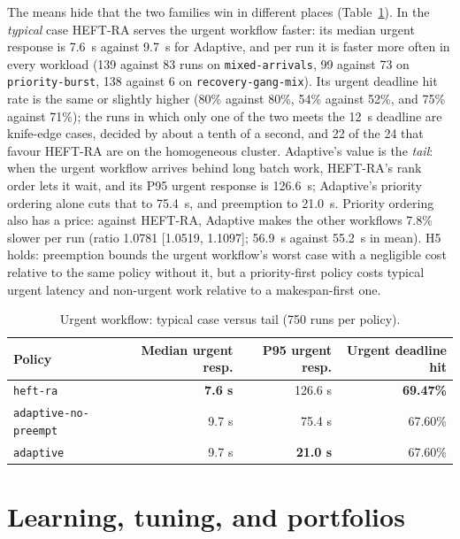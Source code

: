 \documentclass[12pt,a4paper]{report}
\newcommand{\pol}[1]{\texttt{#1}}
\begin{document}
The means hide that the two families win in different places
(Table~\ref{tab:urgent-tail}). In the \emph{typical} case HEFT-RA serves
the urgent workflow faster: its median urgent response is 7.6~s against
9.7~s for Adaptive, and per run it is faster more often in every workload
(139 against 83 runs on \texttt{mixed-arrivals}, 99 against 73 on
\texttt{priority-burst}, 138 against 6 on \texttt{recovery-gang-mix}). Its
urgent deadline hit rate is the same or slightly higher (80\% against 80\%,
54\% against 52\%, and 75\% against 71\%); the runs in which only one of
the two meets the 12~s deadline are knife-edge cases, decided by about a
tenth of a second, and 22 of the 24 that favour HEFT-RA are on the
homogeneous cluster. Adaptive's value is the \emph{tail}: when the urgent
workflow arrives behind long batch work, HEFT-RA's rank order lets it wait,
and its P95 urgent response is 126.6~s; Adaptive's priority ordering alone
cuts that to 75.4~s, and preemption to 21.0~s. Priority ordering also has a
price: against HEFT-RA, Adaptive makes the other workflows 7.8\% slower per
run (ratio 1.0781 [1.0519, 1.1097]; 56.9~s against 55.2~s in mean). H5
holds: preemption bounds the urgent workflow's worst case with a negligible
cost relative to the same policy without it, but a priority-first policy
costs typical urgent latency and non-urgent work relative to a
makespan-first one.

\begin{table}[ht]
\centering
\small
\begin{tabular}{lrrr}
\toprule
Policy & Median urgent resp. & P95 urgent resp. & Urgent deadline hit \\
\midrule
\pol{heft-ra} & \textbf{7.6 s} & 126.6 s & \textbf{69.47\%} \\
\pol{adaptive-no-preempt} & 9.7 s & 75.4 s & 67.60\% \\
\pol{adaptive} & 9.7 s & \textbf{21.0 s} & 67.60\% \\
\bottomrule
\end{tabular}
\caption{Urgent workflow: typical case versus tail (750 runs per policy).}
\label{tab:urgent-tail}
\end{table}

\section{Learning, tuning, and portfolios}
\end{document}
